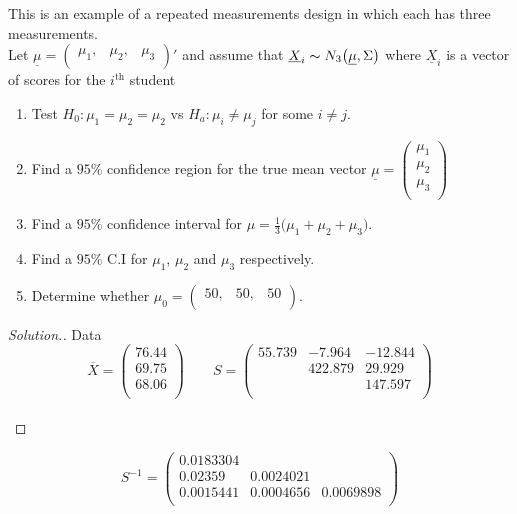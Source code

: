 \documentclass[11pt,a4paper]{article}
\theoremstyle{definition}
\newenvironment{solution}
  {\renewcommand{\qedsymbol}{}\begin{proof}[\textit{Solution}.]}
  {\end{proof}}
\begin{document}
This is an example of a repeated measurements design in which each has three measurements.\\

Let $\underline{\mu}=\begin{pmatrix}
\mu_1, & \mu_2, & \mu_3\\
\end{pmatrix}'$ and assume that $\underline{X}_i\thicksim N_3\big(\underline{\mu},\Sigma\big)$ where $\underline{X}_i$ is a vector of scores for the $i^{\text{th}}$ student

\begin{enumerate}
\item Test $H_0:\mu_1 = \mu_2 = \mu_2$ vs $H_a: \mu_i\neq \mu_j$ for some $i\neq j$.
\item Find a $95\%$ confidence region for the true mean vector $\underline{\mu}=\begin{pmatrix}
\mu_1\\ \mu_2\\ \mu_3\\
\end{pmatrix}
$
\item Find a $95\%$ confidence interval for $\mu = \frac{1}{3}\big(\mu_1+\mu_2+\mu_3\big)$.
\item Find a $95\%$ C.I for $\mu_1$, $\mu_2$ and $\mu_3$ respectively.
\item Determine whether $\mu_0 = \begin{pmatrix}
50, & 50, & 50\\
\end{pmatrix}$.\\
\end{enumerate}



\begin{solution}
Data
$$\overline{X}=\begin{pmatrix}
76.44\\ 
69.75\\
68.06\\
\end{pmatrix}
\qquad 
S = 
\begin{pmatrix}
55.739 & -7.964 & -12.844\\
       &  422.879 & 29.929\\
       &          & 147.597\\
\end{pmatrix}
$$\\
\end{solution}

$$S^{-1} = \begin{pmatrix}
0.0183304 & & \\
0.02359   & 0.0024021 & \\
0.0015441 & 0.0004656 & 0.0069898\\   
\end{pmatrix}$$\\
\end{document}
